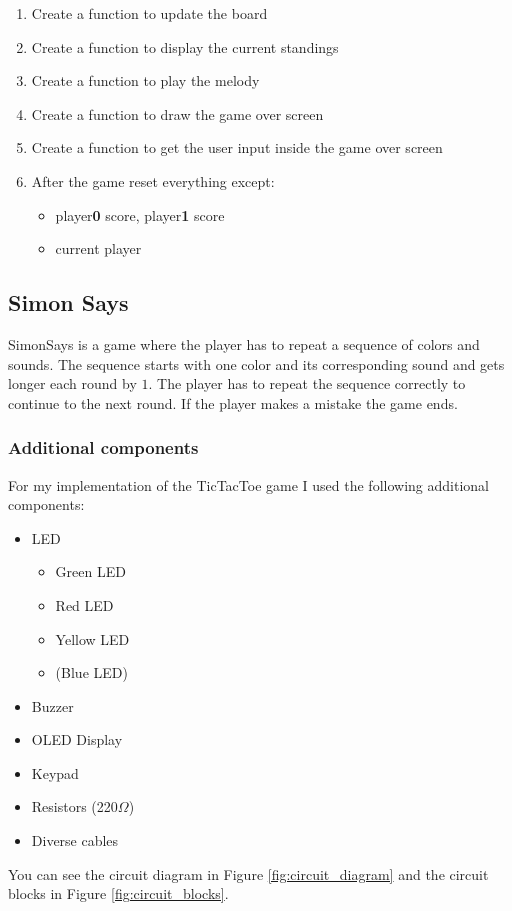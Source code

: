 \documentclass[10pt, oneside]{article}
\theoremstyle{remark}
\begin{document}
\begin{enumerate}
\begin{itemize}
  \end{itemize}
  \item Create a function to update the board
  \item Create a function to display the current standings
  \item Create a function to play the melody
  \item Create a function to draw the game over screen
  \item Create a function to get the user input inside the game over screen
  \item After the game reset everything except:
  \begin{itemize}
    \item player\textbf{0} score, player\textbf{1} score
    \item current player
  \end{itemize}
\end{enumerate}

\subsection{Simon Says}
SimonSays is a game where the player has to repeat a sequence of colors and sounds. The sequence starts with one color and its corresponding sound and gets longer each round by $1$. The player has to repeat the sequence correctly to continue to the next round. If the player makes a mistake the game ends.

\subsubsection{Additional components}
For my implementation of the TicTacToe game I used the following additional components:
\begin{itemize}
  \item LED
  \begin{itemize}
    \item Green LED
    \item Red LED
    \item Yellow LED
    \item (Blue LED)
  \end{itemize}
  \item Buzzer
  \item OLED Display
  \item Keypad
  \item Resistors (220$\Omega$)
  \item Diverse cables
\end{itemize}
You can see the circuit diagram in Figure \ref{fig:circuit_diagram} and the circuit blocks in Figure \ref{fig:circuit_blocks}.
\end{document}
